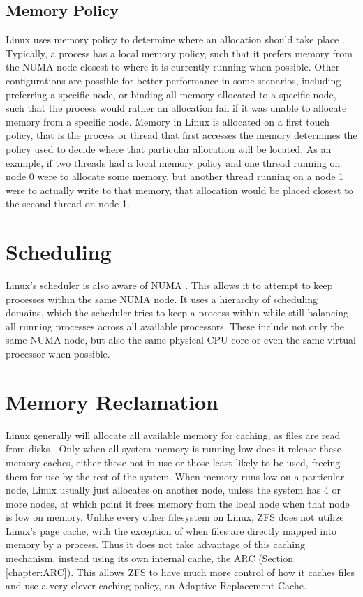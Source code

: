 \subsection{Memory Policy}
Linux uses memory policy to determine where an allocation should take place \cite[{Documentation/admin-guide/mm/numa\_memory\_policy.rst}]{linux}. 
Typically, a process has a local memory policy, such that it prefers memory from the NUMA node closest to where it is currently running when possible. 
Other configurations are possible for better performance in some scenarios, including preferring a specific node,
or binding all memory allocated to a specific node, such that the process would rather an allocation fail if it was unable to allocate memory 
from a specific node.
Memory in Linux is allocated on a first touch policy, that is the process or thread that first accesses the memory determines the policy used to decide
where that particular allocation will be located.
As an example, if two threads had a local memory policy and one thread running on node 0 were to allocate some memory, but another thread running on a node 1 were to actually write to that
memory, that allocation would be placed closest to the second thread on node 1.

\section{Scheduling}
Linux's scheduler is also aware of NUMA \cite[{Documentation/scheduler/sched-domains.txt}]{linux}.
This allows it to attempt to keep processes within the same NUMA node.
It uses a hierarchy of scheduling domains, which the scheduler tries to keep a process within while still balancing all running processes across
all available processors. 
These include not only the same NUMA node, but also the same physical CPU core or even the same virtual processor when possible.

\section{Memory Reclamation}
Linux generally will allocate all available memory for caching, as files are read from disks \cite{lameter_numa_2013}.
Only when all system memory is running low does it release these memory caches, either those not in use or those least likely to be used,
freeing them for use by the rest of the system.
When memory runs low on a particular node, Linux usually just allocates on another node, unless the system has 4 or more nodes,
at which point it frees memory from the local node when that node is low on memory.
Unlike every other filesystem on Linux, ZFS does not utilize Linux's page cache, with the exception of when files are directly mapped into memory
by a process.
Thus it does not take advantage of this caching mechanism, instead using its own internal cache, the ARC (Section \ref{chapter:ARC}).
This allows ZFS to have much more control of how it caches files and use a very clever caching policy, an Adaptive Replacement Cache.

